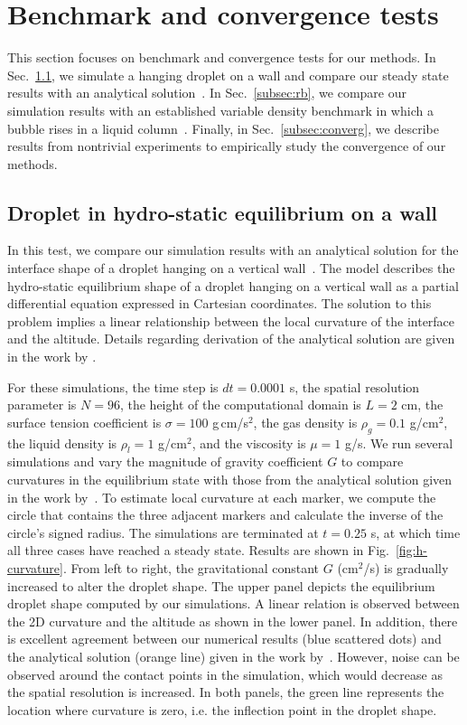 \documentclass[%
 aip,
 amsmath,amssymb,
 reprint,
 floatfix
]{revtex4-1}
\begin{document}
\section {Benchmark and convergence tests \label{sec:veri}}
This section focuses on benchmark and convergence tests for our methods. In Sec.~\ref{subsec:equi}, we simulate a hanging droplet on a wall and compare our steady state results with an analytical solution~\cite{cimpeanu2021motion}. In Sec.~\ref{subsec:rb}, we compare our simulation results with an established variable density benchmark in which a bubble rises in a liquid column~\cite{turek2021numerical}. Finally, in Sec.~\ref{subsec:converg}, we describe results from nontrivial experiments to empirically study the convergence of our methods.



\subsection {Droplet in hydro-static equilibrium on a wall}\label{subsec:equi}
In this test, we compare our simulation results with an analytical solution for the interface shape of a droplet hanging on a vertical wall~\cite{cimpeanu2021motion}. The model describes the hydro-static equilibrium shape of a droplet hanging on a vertical wall as a partial differential equation expressed in Cartesian coordinates. The solution to this problem implies a linear relationship between the local curvature of the interface and the altitude. Details regarding derivation of the analytical solution are given in the work by \citet{cimpeanu2021motion}.  


For these simulations, the time step is $dt=0.0001$ s, the spatial resolution parameter is $N=96$, the height of the computational domain is $L=2$ cm, the surface tension coefficient is $\sigma=100$ g\,cm/s$^2$, the gas density is $\rho_g=0.1$ g/cm$^2$, the liquid density is $\rho_l=1$ g/cm$^2$, and the viscosity is $\mu=1$ g/s. We run several simulations and vary the magnitude of gravity coefficient $G$ to compare curvatures in the equilibrium state with those from the analytical solution given in the work by~\citet{cimpeanu2021motion}. To estimate local curvature at each marker, we compute the circle that contains the three adjacent markers and calculate the inverse of the circle's signed radius. The simulations are terminated at $t = 0.25$ s, at which time all three cases have reached a steady state. Results are shown in Fig.~\ref{fig:h-curvature}. From left to right, the gravitational constant $G$ (cm$^2$/s) is gradually increased to alter the droplet shape. The upper panel depicts the equilibrium droplet shape computed by our simulations. A linear relation is observed between the 2D curvature and the altitude as shown in the lower panel. In addition, there is excellent agreement between our numerical results (blue scattered dots) and the analytical solution (orange line) given in the work by~\citet{cimpeanu2021motion}. However, noise can be observed around the contact points in the simulation, which would decrease as the spatial resolution is increased. In both panels, the green line represents the location where curvature is zero, i.e. the inflection point in the droplet shape.
    
\end{document}
